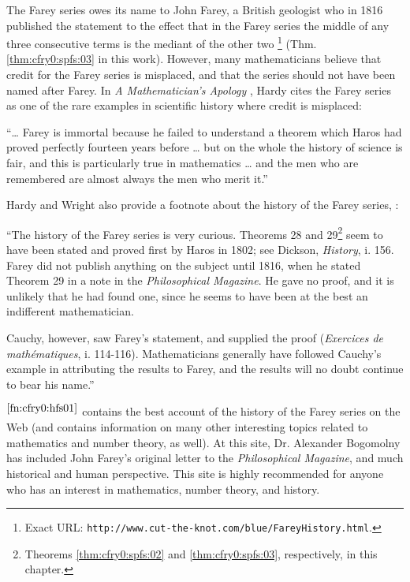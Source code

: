 The Farey series owes its name to John Farey,
 a British geologist who in 1816
published the statement to the effect that in the Farey series the middle
of any three consecutive terms is the mediant of the other two
\cite{bibref:w:CutTheKnotMainPage}\footnote{\label{fn:cfry0:hfs01}Exact URL:
\texttt{http://www.cut-the-knot.com/blue/FareyHistory.html}.} (Thm.
\ref{thm:cfry0:spfs:03} in this work).
However, many mathematicians
believe that credit for the Farey series is misplaced, and that the
series should not have been named after Farey.  In
\emph{A Mathematician's Apology} 
\cite[pp. 81-82]{bibref:b:mathematiciansapology:1940},
Hardy cites the Farey series as one of the rare examples in scientific
history where credit is misplaced:

\begin{indentedquote}
``\ldots{} Farey is immortal because he failed to understand a theorem
which Haros had proved perfectly fourteen years
before \ldots{} but on the whole the history of science is fair, and 
this is particularly
true in mathematics \ldots{} and the men who are remembered are almost
always the men who merit it.''
\end{indentedquote}

Hardy and Wright also provide a footnote about the history
of the Farey series, \cite[pp. 36-37]{bibref:b:HardyAndWrightClassic}:

\begin{indentedquote}
``The history of the Farey series is very curious.
Theorems 28 and 29\footnote{Theorems
\ref{thm:cfry0:spfs:02} and \ref{thm:cfry0:spfs:03},
respectively, in this chapter.} seem to have been stated and proved first by
Haros in 1802; see Dickson, \emph{History}, i. 156.
Farey did not publish anything on the subject until
1816, when he stated Theorem 29 in a note in the
\emph{Philosophical Magazine}.  He gave no proof, and it is unlikely that he
had found one, since he seems to have been at the best an
indifferent mathematician.

Cauchy, however, saw Farey's statement, and supplied the
proof (\emph{Exercices de math\'ematiques}, i. 114-116).  Mathematicians
generally have followed Cauchy's example in attributing the results to
Farey, and the results will no doubt continue to bear his name.''
\end{indentedquote}

\cite{bibref:w:CutTheKnotMainPage}$^{\ref{fn:cfry0:hfs01}}$ contains the best
account of the history of the Farey series on the Web (and contains
information on many other
interesting topics related to mathematics and number theory, as well).  At this
site, Dr. Alexander Bogomolny
 has included John Farey's
original letter to the \emph{Philosophical Magazine}, and much historical
and human perspective.  This site is highly recommended for anyone who has
an interest in mathematics, number theory, and history.


